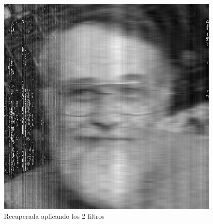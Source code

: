 \begin{figure}[H]
\begin {center}
\includegraphics[width=360pt]{imagenes/kern-gauss100-recovered-both.png}
\end {center}
\caption{Recuperada aplicando los 2 filtros}
\label{fig:SinProm}
\end{figure}
